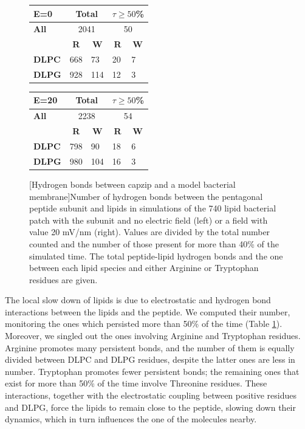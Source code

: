 \begin{figure}[t!]
\centering
 \def\arraystretch{1.6}
\begin{tabular}{l|ll|ll}
\hline
\textbf{E=0} & \multicolumn{2}{c|}{Total} & \multicolumn{2}{c}{$\displaystyle\tau \ge 50$\%} \\
\hline
\textbf{All} & \multicolumn{2}{c|}{2041} & \multicolumn{2}{c}{50} \\
\hline
\hline
  & \multicolumn{1}{c}{\textbf{R}} & \multicolumn{1}{c|}{\textbf{W}} & \multicolumn{1}{c}{\textbf{R}} & \multicolumn{1}{c}{\textbf{W}} \\
 \hline
 \textbf{DLPC} & 668 & 73 & 20 & 7 \\
 \textbf{DLPG} & 928 & 114 & 12 & 3 \\
 \hline
 \end{tabular}
 \hspace{0.4cm}
 \begin{tabular}{l|ll|ll}
 \hline
\textbf{E=20} & \multicolumn{2}{c|}{Total} & \multicolumn{2}{c}{$\displaystyle\tau \ge 50$\%} \\
\hline
\textbf{All} & \multicolumn{2}{c|}{2238} & \multicolumn{2}{c}{54} \\
\hline
\hline
 & \multicolumn{1}{c}{\textbf{R}} & \multicolumn{1}{c|}{\textbf{W}} & \multicolumn{1}{c}{\textbf{R}} & \multicolumn{1}{c}{\textbf{W}} \\
 \hline
 \textbf{DLPC} & 798 & 90 & 18 & 6 \\
 \textbf{DLPG} & 980 & 104 & 16 & 3 \\
 \hline
 \end{tabular}
[Hydrogen bonds between capzip and a model bacterial membrane]{Number of hydrogen bonds between the pentagonal peptide subunit and lipids in simulations of the 740 lipid bacterial patch with the subunit and no electric field (left) or a field with value 20 mV/nm (right). Values are divided by the total number counted and the number of those present for more than 40\% of the simulated time. The total peptide-lipid hydrogen bonds and the one between each lipid species and either Arginine or Tryptophan residues are given.}
\label{table:hb_pr_lip}
\end{figure}

The local slow down of lipids is due to electrostatic and hydrogen bond interactions between the lipids and the peptide. We computed their number, monitoring the ones which persisted more than 50\% of the time (Table \ref{table:hb_pr_lip}). Moreover, we singled out the ones involving Arginine and Tryptophan residues.
%
Arginine promotes many persistent bonds, and the number of them is equally divided between DLPC and DLPG residues, despite the latter ones are less in number. Tryptophan promotes fewer persistent bonds; the remaining ones that exist for more than 50\% of the time involve Threonine residues.
%
These interactions, together with the electrostatic coupling between positive residues and DLPG, force the lipids to remain close to the peptide, slowing down their dynamics, which in turn influences the one of the molecules nearby.

